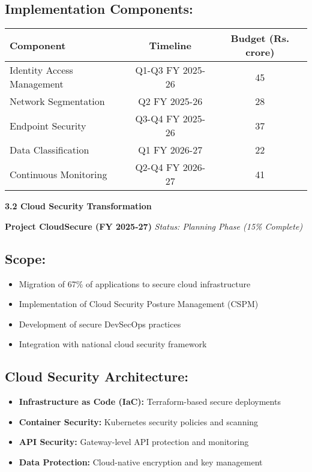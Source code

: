 \documentclass[12pt,a4paper]{report}
\newcommand{\sectionheader}[1]{\textbf{\color{govblue}#1}}
\newcommand{\initiative}[1]{\textbf{\color{secgreen}\ding{51} #1}}
\newcommand{\progress}[1]{\textit{#1}}
\begin{document}
\subsection*{Implementation Components:}
\begin{table}[h]
\centering
\begin{tabular}{@{}lcc@{}}
\toprule
\textbf{Component} & \textbf{Timeline} & \textbf{Budget (Rs. crore)} \\
\midrule
Identity Access Management & Q1-Q3 FY 2025-26 & 45 \\
Network Segmentation & Q2 FY 2025-26 & 28 \\
Endpoint Security & Q3-Q4 FY 2025-26 & 37 \\
Data Classification & Q1 FY 2026-27 & 22 \\
Continuous Monitoring & Q2-Q4 FY 2026-27 & 41 \\
\bottomrule
\end{tabular}
\end{table}

\sectionheader{3.2 Cloud Security Transformation}

\initiative{Project CloudSecure (FY 2025-27)}
\progress{Status: Planning Phase (15\% Complete)}

\subsection*{Scope:}
\begin{itemize}[leftmargin=*, itemsep=3pt]
    \item Migration of 67\% of applications to secure cloud infrastructure
    \item Implementation of Cloud Security Posture Management (CSPM)
    \item Development of secure DevSecOps practices
    \item Integration with national cloud security framework
\end{itemize}

\subsection*{Cloud Security Architecture:}
\begin{itemize}[leftmargin=*, itemsep=3pt]
    \item \textbf{Infrastructure as Code (IaC):} Terraform-based secure deployments
    \item \textbf{Container Security:} Kubernetes security policies and scanning
    \item \textbf{API Security:} Gateway-level API protection and monitoring
    \item \textbf{Data Protection:} Cloud-native encryption and key management
\end{itemize}
\end{document}
